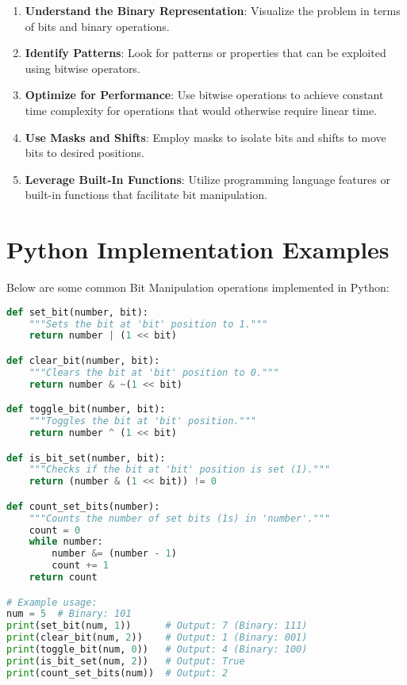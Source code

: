 \begin{enumerate}
    \item \textbf{Understand the Binary Representation}: Visualize the problem in terms of bits and binary operations.
    \item \textbf{Identify Patterns}: Look for patterns or properties that can be exploited using bitwise operators.
    \item \textbf{Optimize for Performance}: Use bitwise operations to achieve constant time complexity for operations that would otherwise require linear time.
    \item \textbf{Use Masks and Shifts}: Employ masks to isolate bits and shifts to move bits to desired positions.
    \item \textbf{Leverage Built-In Functions}: Utilize programming language features or built-in functions that facilitate bit manipulation.
\end{enumerate}

\section*{Python Implementation Examples}

Below are some common Bit Manipulation operations implemented in Python:

\begin{fullwidth}
\begin{lstlisting}[language=Python]
def set_bit(number, bit):
    """Sets the bit at 'bit' position to 1."""
    return number | (1 << bit)

def clear_bit(number, bit):
    """Clears the bit at 'bit' position to 0."""
    return number & ~(1 << bit)

def toggle_bit(number, bit):
    """Toggles the bit at 'bit' position."""
    return number ^ (1 << bit)

def is_bit_set(number, bit):
    """Checks if the bit at 'bit' position is set (1)."""
    return (number & (1 << bit)) != 0

def count_set_bits(number):
    """Counts the number of set bits (1s) in 'number'."""
    count = 0
    while number:
        number &= (number - 1)
        count += 1
    return count

# Example usage:
num = 5  # Binary: 101
print(set_bit(num, 1))      # Output: 7 (Binary: 111)
print(clear_bit(num, 2))    # Output: 1 (Binary: 001)
print(toggle_bit(num, 0))   # Output: 4 (Binary: 100)
print(is_bit_set(num, 2))   # Output: True
print(count_set_bits(num))  # Output: 2
\end{lstlisting}
\end{fullwidth}

